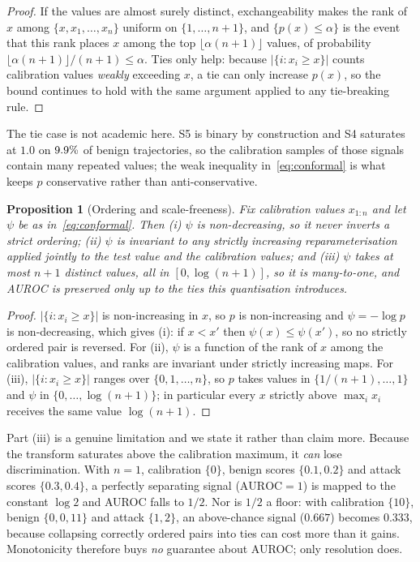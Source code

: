 \documentclass[preprint,12pt,authoryear]{elsarticle}
\newtheorem{proposition}[theorem]{Proposition}
\theoremstyle{definition}
\begin{document}
\begin{proof}
If the values are almost surely distinct, exchangeability makes the rank of $x$
among $\{x, x_1, \dots, x_n\}$ uniform on $\{1,\dots,n+1\}$, and
$\{p(x) \le \alpha\}$ is the event that this rank places $x$ among the top
$\lfloor \alpha (n+1) \rfloor$ values, of probability
$\lfloor \alpha(n+1)\rfloor/(n+1) \le \alpha$. Ties only help: because
$|\{i : x_i \ge x\}|$ counts calibration values \emph{weakly} exceeding $x$, a tie
can only increase $p(x)$, so the bound continues to hold with the same argument
applied to any tie-breaking rule.
\end{proof}

The tie case is not academic here. S5 is binary by construction and S4 saturates
at $1.0$ on $9.9\%$ of benign trajectories, so the calibration samples of those
signals contain many repeated values; the weak inequality in~\eqref{eq:conformal}
is what keeps $p$ conservative rather than anti-conservative.

\begin{proposition}[Ordering and scale-freeness]\label{prop:mono}
Fix calibration values $x_{1:n}$ and let $\psi$ be as in~\eqref{eq:conformal}.
Then (i) $\psi$ is non-decreasing, so it never inverts a strict ordering;
(ii) $\psi$ is invariant to any strictly increasing reparameterisation applied
jointly to the test value and the calibration values; and (iii) $\psi$ takes at most $n+1$ distinct values, all in
$[0, \log(n+1)]$, so it is many-to-one, and AUROC is preserved only up to the
ties this quantisation introduces.
\end{proposition}

\begin{proof}
$|\{i : x_i \ge x\}|$ is non-increasing in $x$, so $p$ is non-increasing and
$\psi = -\log p$ is non-decreasing, which gives (i): if $x < x'$ then
$\psi(x) \le \psi(x')$, so no strictly ordered pair is reversed.
For (ii), $\psi$ is a function of the rank of $x$ among the calibration values,
and ranks are invariant under strictly increasing maps. For (iii),
$|\{i : x_i \ge x\}|$ ranges over $\{0,1,\dots,n\}$, so $p$ takes values in
$\{1/(n{+}1), \dots, 1\}$ and $\psi$ in $\{0, \dots, \log(n{+}1)\}$; in
particular every $x$ strictly above $\max_i x_i$ receives the same value
$\log(n{+}1)$.
\end{proof}

Part (iii) is a genuine limitation and we state it rather than claim more.
Because the transform saturates above the calibration maximum, it \emph{can} lose
discrimination. With $n=1$, calibration $\{0\}$, benign scores $\{0.1, 0.2\}$ and
attack scores $\{0.3, 0.4\}$, a perfectly separating signal ($\mathrm{AUROC}=1$) is
mapped to the constant $\log 2$ and AUROC falls to $1/2$. Nor is $1/2$ a floor:
with calibration $\{10\}$, benign $\{0,0,11\}$ and attack $\{1,2\}$, an
above-chance signal ($0.667$) becomes $0.333$, because collapsing correctly
ordered pairs into ties can cost more than it gains. Monotonicity therefore buys
\emph{no} guarantee about AUROC; only resolution does.
\end{document}
